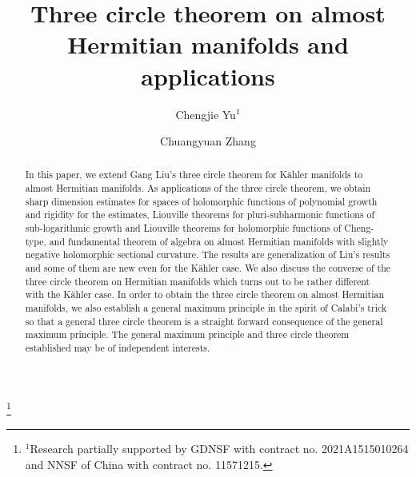 \documentclass[12pt]{amsart}
\theoremstyle{definition}
\theoremstyle{remark}
\numberwithin{equation}{section}
\begin{document}
\title{Three circle theorem on almost Hermitian manifolds and applications}

\author{Chengjie Yu$^1$}
\address{Department of Mathematics, Shantou University, Shantou, Guangdong, 515063, China}
\author{Chuangyuan Zhang}
\address{Department of Mathematics, Shantou University, Shantou, Guangdong, 515063, China}
\thanks{$^1$Research partially supported by GDNSF with contract no. 2021A1515010264 and NNSF of China with contract no. 11571215.}
\renewcommand{\subjclassname}{%
  \textup{2010} Mathematics Subject Classification}
\date{}
\begin{abstract}
In this paper, we extend Gang Liu's three circle theorem for K\"ahler manifolds to almost Hermitian manifolds. As applications of the three circle theorem, we obtain sharp dimension estimates for spaces of holomorphic functions of polynomial growth and rigidity for the estimates, Liouville theorems for pluri-subharmonic functions of sub-logarithmic growth and Liouville theorems for holomorphic functions of Cheng-type, and fundamental theorem of algebra on almost Hermitian manifolds with slightly negative holomorphic sectional curvature. The results are generalization of Liu's results and some of them are new even for the K\"ahler case. We also discuss the converse of the three circle theorem on Hermitian manifolds which turns out to be rather different with the K\"ahler case. In order to obtain the three circle theorem on almost Hermitian manifolds, we also establish a general maximum principle in the spirit of Calabi's trick so that a general three circle theorem is a straight forward consequence of the general maximum principle. The general maximum principle and three circle theorem established may be of independent interests. 
\end{abstract}
\maketitle{}
\maketitle
\end{document}
